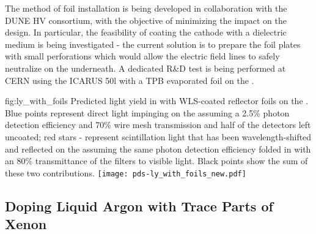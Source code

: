 
The method of foil installation is being developed in collaboration with the DUNE HV consortium, with the objective of minimizing the impact on the  design. 
In particular, the feasibility of coating the cathode with a dielectric medium is being investigated - the current solution is to prepare the foil plates with small perforations which would allow the electric field
lines to safely neutralize on the  underneath. A dedicated R\&D test is being performed at CERN using the ICARUS 50l with a TPB evaporated foil on the . 



\begin{dunefigure}{fig:ly_with_foils}
{Predicted light yield in with WLS-coated reflector foils on the . Blue points represent direct  light impinging on the  assuming a 2.5\% photon detection efficiency and 70\% wire mesh transmission and half of the detectors left uncoated; red stars - represent scintillation light that has been wavelength-shifted and reflected on the  assuming the same photon detection efficiency folded in with an 80\% transmittance of the filters to visible light. Black points show the sum of these two contributions.}
\texttt{[image: pds-ly\_with\_foils\_new.pdf]}
\end{dunefigure}

\subsection{Doping Liquid Argon with Trace Parts of Xenon}
\label{sec:fdsp-pd-enh-xenon}

